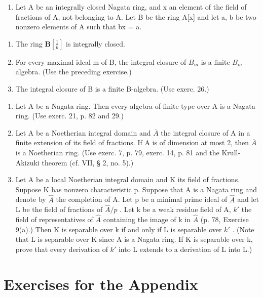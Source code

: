 \begin{enumerate}
\def\labelenumi{\arabic{enumi})}
\setcounter{enumi}{28}
\tightlist
\item
  Let A be an integrally closed Nagata ring, and x an element of the field of fractions of A, not belonging to A. Let B be the ring A{[}x{]} and let a, b be two nonzero elements of A such that bx = a.
\end{enumerate}

\begin{enumerate}
\def\labelenumi{\alph{enumi})}
\item
  The ring \(\mathbf{B}\left[\frac{1}{b}\right]\) is integrally closed.
\item
  For every maximal ideal m of B, the integral closure of \(B_{m}\) is a finite \(B_{m}\)-algebra. (Use the preceding exercise.)
\item
  The integral closure of B is a finite B-algebra. (Use exerc. 26.)
\end{enumerate}

\begin{enumerate}
\def\labelenumi{\arabic{enumi})}
\setcounter{enumi}{29}
\item
  Let A be a Nagata ring. Then every algebra of finite type over A is a Nagata ring. (Use exerc. 21, p. 82 and 29.)
\item
  Let A be a Noetherian integral domain and \(\overline{A}\) the integral closure of A in a finite extension of its field of fractions. If A is of dimension at most 2, then \(\overline{A}\) is a Noetherian ring. (Use exerc. 7, p. 79, exerc. 14, p. 81 and the Krull-Akizuki theorem (cf. VII, § 2, no. 5).)
\item
  Let A be a local Noetherian integral domain and K its field of fractions. Suppose K has nonzero characteristic p. Suppose that A is a Nagata ring and denote by \(\hat{A}\) the completion of A. Let p be a minimal prime ideal of \(\hat{A}\) and let L be the field of fractions of \(\hat{A}/p\) . Let k be a weak residue field of A, \(k'\) the field of representatives of \(\hat{A}\) containing the image of k in \(\hat{A}\) (p. 78, Exercise 9(a).) Then K is separable over k if and only if L is separable over \(k'\) . (Note that L is separable over K since A is a Nagata ring. If K is separable over k, prove that every derivation of \(k'\) into L extends to a derivation of L into L.)
\end{enumerate}

\section*{Exercises for the Appendix}
{}

